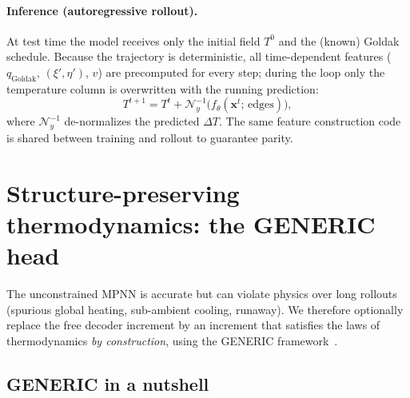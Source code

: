 \documentclass[11pt]{article}
\theoremstyle{definition}
\begin{document}
\paragraph{Inference (autoregressive rollout).} At test time the model receives only
the initial field $T^0$ and the (known) Goldak schedule. Because the trajectory is
deterministic, all time-dependent features ($q_{\mathrm{Goldak}}$, $(\xi',\eta')$, $v$)
are precomputed for every step; during the loop only the temperature column is
overwritten with the running prediction:
\begin{equation}
  T^{t+1} = T^{t} + \mathcal{N}^{-1}_y\!\big(f_\theta(\bm x^t; \,\text{edges})\big),
\end{equation}
where $\mathcal N^{-1}_y$ de-normalizes the predicted $\Delta T$. The same feature
construction code is shared between training and rollout to guarantee parity.

\section{Structure-preserving thermodynamics: the GENERIC head}
\label{sec:generic}

The unconstrained MPNN is accurate but can violate physics over long rollouts
(spurious global heating, sub-ambient cooling, runaway). We therefore optionally
replace the free decoder increment by an increment that satisfies the laws of
thermodynamics \emph{by construction}, using the GENERIC
framework~\cite{grmela1997dynamics,ottinger2005beyond}.

\subsection{GENERIC in a nutshell}
\end{document}
